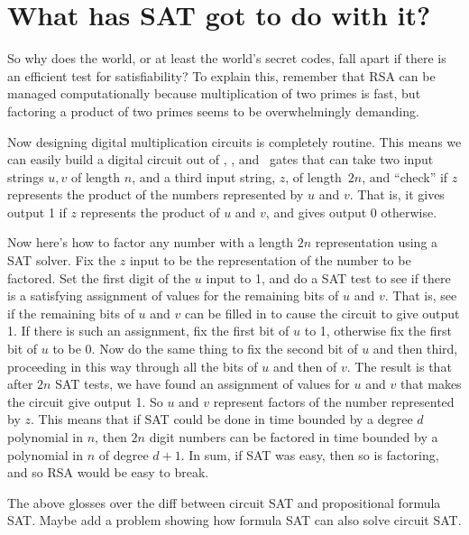 \section{What has SAT got to do with it?}\label{SAT_RSA-sec}
So why does the world, or at least the world's secret codes, fall
apart if there is an efficient test for satisfiability?  To explain
this, remember that RSA can be managed computationally because
multiplication of two primes is fast, but factoring a product of two
primes seems to be overwhelmingly demanding.

Now designing digital multiplication circuits is completely routine.
This means we can easily build a digital circuit out of \QAND, \QOR,
and \QNOT\ gates that can take two input strings $u,v$ of length $n$,
and a third input string, $z$, of length~$2n$, and ``check'' if $z$
represents the product of the numbers represented by $u$ and $v$.
That is, it gives output 1 if $z$ represents the product of $u$ and
$v$, and gives output 0 otherwise.

Now here's how to factor any number with a length $2n$ representation
using a SAT solver.  Fix the $z$ input to be the representation of the
number to be factored.  Set the first digit of the $u$ input to 1, and
do a SAT test to see if there is a satisfying assignment of values for
the remaining bits of $u$ and $v$.  That is, see if the remaining bits
of $u$ and $v$ can be filled in to cause the circuit to give output 1.
If there is such an assignment, fix the first bit of $u$ to 1,
otherwise fix the first bit of $u$ to be 0.  Now do the same thing to
fix the second bit of $u$ and then third, proceeding in this way
through all the bits of $u$ and then of $v$.  The result is that after
$2n$ SAT tests, we have found an assignment of values for $u$ and $v$
that makes the circuit give output 1.  So $u$ and $v$ represent
factors of the number represented by $z$.  This means that if SAT
could be done in time bounded by a degree $d$ polynomial in $n$, then
$2n$ digit numbers can be factored in time bounded by a polynomial in
$n$ of degree $d+1$.  In sum, if SAT was easy, then so is factoring,
and so RSA would be easy to break.

\begin{editingnotes}
The above glosses over the diff between circuit SAT and propositional
formula SAT.  Maybe add a problem showing how formula SAT can also
solve circuit SAT.
\end{editingnotes}

\iffalse

